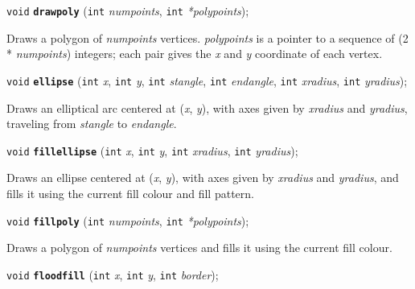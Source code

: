 \documentclass[a4paper,12pt]{article}
\newcommand{\V}{\texttt{void}}      %
\newcommand{\I}{\texttt{int}}       %
\newcommand{\func}[1]{\textbf{\texttt{#1}}}  %
\newcommand{\A}[1]{\emph{#1}}       %
\newenvironment{bgi}
{ %
  \begin{snugshade}
}
{ %
  \end{snugshade}
}
\begin{document}

\label{sec:drawpoly}

\begin{bgi}
\V{} \func{drawpoly} (\I{} \A{numpoints}, \I{} \A{*polypoints});
\end{bgi}

Draws a polygon of \A{numpoints} vertices. \A{polypoints} is a
pointer to a sequence of (2 * \A{numpoints}) integers; each pair gives
the \A{x} and \A{y} coordinate of each vertex.


\label{sec:ellipse}

\begin{bgi}
\V{} \func{ellipse} (\I{} \A{x}, \I{} \A{y}, \I{} \A{stangle}, \I{}
\A{endangle}, \I{} \A{xradius}, \I{} \A{yradius});
\end{bgi}

Draws an elliptical arc centered at (\A{x}, \A{y}), with axes given by
\A{xradius} and \A{yradius}, traveling from \A{stangle} to
\A{endangle}.


\label{sec:fillellipse}

\begin{bgi}
\V{} \func{fillellipse} (\I{} \A{x}, \I{} \A{y}, \I{} \A{xradius},
\I{} \A{yradius});
\end{bgi}

Draws an ellipse centered at (\A{x}, \A{y}), with axes given by
\A{xradius} and \A{yradius}, and fills it using the current fill
colour and fill pattern.


\label{sec:fillpoly}

\begin{bgi}
\V{} \func{fillpoly} (\I{} \A{numpoints}, \I{} \A{*polypoints});
\end{bgi}

Draws a polygon of \A{numpoints} vertices and fills it using the
current fill colour.


\label{sec:floodfill}

\begin{bgi}
\V{} \func{floodfill} (\I{} \A{x}, \I{} \A{y}, \I{} \A{border});
\end{bgi}
\end{document}
